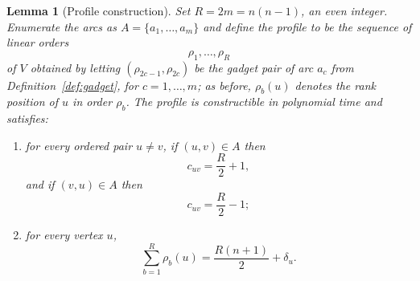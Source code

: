 \documentclass[11pt]{article}
\newtheorem{lemma}{Lemma}
\begin{document}
\begin{lemma}[Profile construction]\label{lem:profile}
Set $R=2m=n(n-1)$, an even integer.  Enumerate the arcs as $A=\{a_1,\ldots,a_m\}$ and define the \emph{profile} to be the sequence of linear orders
\begin{equation}
  \rho_1,\ldots,\rho_R
\end{equation}
of $V$ obtained by letting $(\rho_{2c-1},\rho_{2c})$ be the gadget pair of arc $a_c$ from Definition~\ref{def:gadget}, for $c=1,\ldots,m$; as before, $\rho_b(u)$ denotes the rank position of $u$ in order $\rho_b$.  The profile is constructible in polynomial time and satisfies:
\begin{enumerate}[label=(\roman*)]
\item for every ordered pair $u\ne v$, if $(u,v)\in A$ then
\begin{equation}
  c_{uv}=\frac R2+1,
\end{equation}
and if $(v,u)\in A$ then
\begin{equation}
  c_{uv}=\frac R2-1;
\end{equation}
\item for every vertex $u$,
\begin{equation}
  \sum_{b=1}^R \rho_b(u)=\frac{R(n+1)}2+\delta_u.
\end{equation}
\end{enumerate}
\end{lemma}
\end{document}

